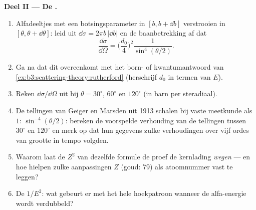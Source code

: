 \begin{problem}
\medskip\noindent\textbf{Deel II --- De .}
\begin{enumerate}[resume]
  \item Alfadeeltjes met een botsingsparameter in $[b, b + \dd b]$
        verstrooien in $[\theta, \theta + \dd\theta]$: leid uit $\dd\sigma =
        2\pi b\,|\dd b|$ en de baanbetrekking af dat
        \[
        \frac{\dd\sigma}{\dd\Omega} =
        \Big(\frac{d_0}{4}\Big)^2\frac{1}{\sin^4(\theta/2)} .
        \]
  \item Ga na dat dit overeenkomt met het born- of kwantumantwoord van
        \cref{ex:b3:scattering-theory:rutherford} (herschrijf $d_0$ in
        termen van $E$).
  \item Reken $\dd\sigma/\dd\Omega$ uit bij $\theta = 30^\circ$,
        $60^\circ$ en $120^\circ$ (in barn per steradiaal).
  \item De tellingen van Geiger en Marsden uit 1913 schalen bij vaste
        meetkunde als $1{:}\,\sin^{-4}(\theta/2)$: bereken de voorspelde
        verhouding van de tellingen tussen $30^\circ$ en $120^\circ$ en
        merk op dat hun gegevens zulke verhoudingen over vijf ordes van
        grootte in tempo volgden.
  \item Waarom laat de $Z^2$ van dezelfde formule de proef de kernlading
        \emph{wegen} --- en hoe hielpen zulke aanpassingen $Z$ (goud: 79)
        als atoomnummer vast te leggen?
  \item De $1/E^2$: wat gebeurt er met het hele hoekpatroon wanneer de
        alfa-energie wordt verdubbeld?
\end{enumerate}


\end{problem}

